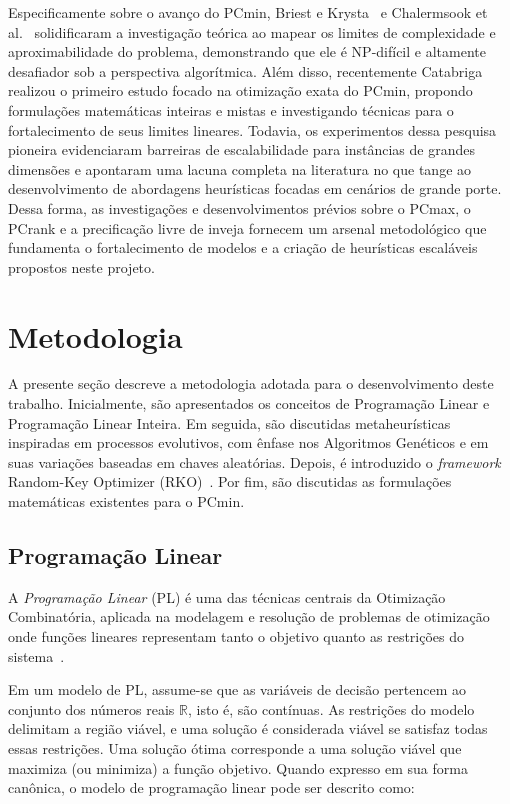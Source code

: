 \documentclass[11pt]{article}
\begin{document}
Especificamente sobre o avanço do PCmin, Briest e Krysta~\cite{briest2007} e Chalermsook et al.~\cite{chalermsook2012} solidificaram a investigação teórica ao mapear os limites de complexidade e aproximabilidade do problema, demonstrando que ele é NP-difícil e altamente desafiador sob a perspectiva algorítmica. Além disso, recentemente Catabriga~\cite{catabriga2025} realizou o primeiro estudo focado na otimização exata do PCmin, propondo formulações matemáticas inteiras e mistas e investigando técnicas para o fortalecimento de seus limites lineares. Todavia, os experimentos dessa pesquisa pioneira evidenciaram barreiras de escalabilidade para instâncias de grandes dimensões e apontaram uma lacuna completa na literatura no que tange ao desenvolvimento de abordagens heurísticas focadas em cenários de grande porte. Dessa forma, as investigações e desenvolvimentos prévios sobre o PCmax, o PCrank e a precificação livre de inveja fornecem um arsenal metodológico que fundamenta o fortalecimento de modelos e a criação de heurísticas escaláveis propostos neste projeto. 
\section{Metodologia}

A presente seção descreve a metodologia adotada para o desenvolvimento deste trabalho. Inicialmente, são apresentados os conceitos de Programação Linear e Programação Linear Inteira. Em seguida, são discutidas metaheurísticas inspiradas em processos evolutivos, com ênfase nos Algoritmos Genéticos e em suas variações baseadas em chaves aleatórias. Depois, é introduzido o \emph{framework} Random-Key Optimizer (RKO)~\cite{Chaves2023}. Por fim, são discutidas as formulações matemáticas existentes para o PCmin.

\subsection{Programação Linear}

A \textit{Programação Linear} (PL) é uma das técnicas centrais da Otimização Combinatória, aplicada na modelagem e resolução de problemas de otimização onde funções lineares representam tanto o objetivo quanto as restrições do sistema~\cite{Goldbarg2005}.

Em um modelo de PL, assume-se que as variáveis de decisão pertencem ao conjunto dos números reais $\mathbb{R}$, isto é, são contínuas. As restrições do modelo delimitam a região viável, e uma solução é considerada viável se satisfaz todas essas restrições. Uma solução ótima corresponde a uma solução viável que maximiza (ou minimiza) a função objetivo. Quando expresso em sua forma canônica, o modelo de programação linear pode ser descrito como:
\end{document}
